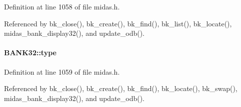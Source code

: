 \begin{DoxyItemize}
\item 
\end{DoxyItemize}

Definition at line 1058 of file midas.h.

Referenced by bk\_\-close(), bk\_\-create(), bk\_\-find(), bk\_\-list(), bk\_\-locate(), midas\_\-bank\_\-display32(), and update\_\-odb().
\paragraph[{type}]{ {\bf BANK32::type}}\hfill\label{structBANK32_a24b3068dc97237c8525e2188586a2c1b}

\begin{DoxyItemize}
\item 
\end{DoxyItemize}

Definition at line 1059 of file midas.h.

Referenced by bk\_\-close(), bk\_\-create(), bk\_\-find(), bk\_\-locate(), bk\_\-swap(), midas\_\-bank\_\-display32(), and update\_\-odb().